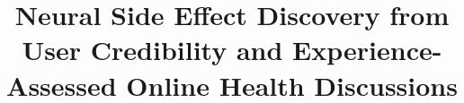 \documentclass{bmcart}
\begin{document}
\begin{frontmatter}

\begin{fmbox}


\title{Neural Side Effect Discovery from User Credibility and Experience-Assessed Online Health Discussions}


\author[
   addressref={aff1},
   email={vhnguyen@u.nus.edu}
]{ }
\author[
   addressref={aff1},
   email={sugiyama@comp.nus.edu.sg}
]{ }
\author[
   addressref={aff1},
   email={kanmy@comp.nus.edu.sg}
]{ }


\end{fmbox}
\end{frontmatter}
\end{document}
